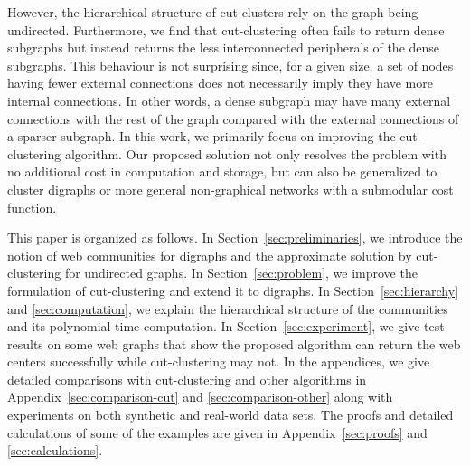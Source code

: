 However, the hierarchical structure of cut-clusters rely on the graph being undirected. Furthermore,
we find that cut-clustering often fails to return dense subgraphs but instead returns the less
interconnected peripherals of the dense subgraphs. This behaviour is not surprising since, for a given
size, a set of nodes having fewer external connections does not necessarily imply they have more
internal connections. In other words, a dense subgraph may have many external connections
with the rest of the graph compared with the external connections of a sparser subgraph.
In this work, we primarily focus on improving the cut-clustering algorithm. Our proposed solution
not only resolves the problem with no additional cost in computation and storage, but can also be
generalized to cluster digraphs or more general non-graphical networks with a submodular cost
function. 

This paper is organized as follows. In Section~\ref{sec:preliminaries}, we introduce the notion of web communities for digraphs and the approximate solution by cut-clustering for undirected graphs. In Section~\ref{sec:problem}, we improve the formulation of cut-clustering and extend it to digraphs. In  Section~\ref{sec:hierarchy} and \ref{sec:computation}, we explain the hierarchical structure of the communities and its polynomial-time computation. In Section~\ref{sec:experiment}, we give test results on some web graphs that show the proposed algorithm can return the web centers successfully while cut-clustering may not. In the appendices, we give detailed comparisons with cut-clustering and other algorithms in Appendix~\ref{sec:comparison-cut} and \ref{sec:comparison-other} along with experiments on both synthetic and real-world data sets. The proofs and detailed calculations of some of the examples are given in Appendix~\ref{sec:proofs} and \ref{sec:calculations}.